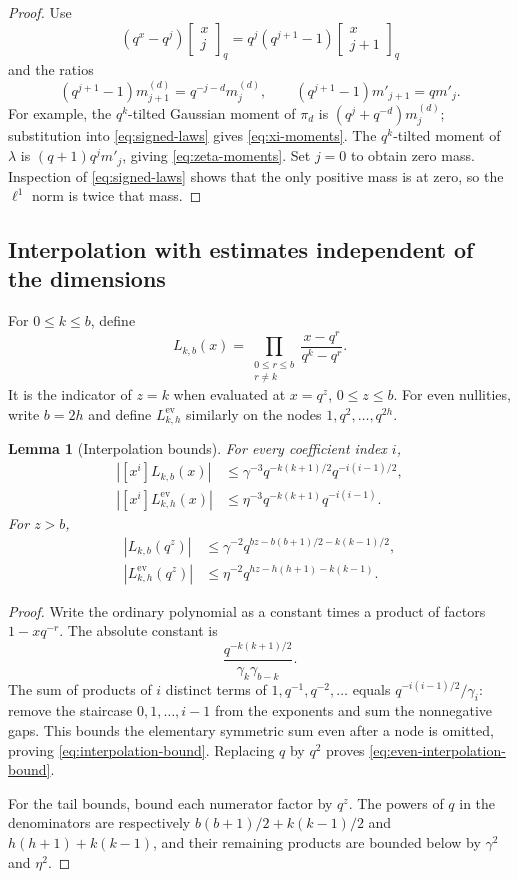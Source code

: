 \documentclass[11pt]{article}
\newtheorem{lemma}[theorem]{Lemma}
\theoremstyle{definition}
\theoremstyle{remark}
\newcommand{\gb}[2]{\begin{bmatrix}#1\\#2\end{bmatrix}_{q}}
\begin{document}
\begin{proof}
Use
\begin{equation}\label{eq:gaussian-shift}
 (q^x-q^j)\gb{x}{j}
 =q^j(q^{j+1}-1)\gb{x}{j+1}
\end{equation}
and the ratios
\[
 (q^{j+1}-1)m_{j+1}^{(d)}=q^{-j-d}m_j^{(d)},\qquad
 (q^{j+1}-1)m'_{j+1}=q m'_j.
\]
For example, the $q^k$-tilted Gaussian moment of $\pi_d$ is $(q^j+q^{-d})m_j^{(d)}$; substitution into \eqref{eq:signed-laws} gives \eqref{eq:xi-moments}. The $q^k$-tilted moment of $\lambda$ is $(q+1)q^jm'_j$, giving \eqref{eq:zeta-moments}. Set $j=0$ to obtain zero mass. Inspection of \eqref{eq:signed-laws} shows that the only positive mass is at zero, so the $\ell^1$ norm is twice that mass.
\end{proof}

\subsection{Interpolation with estimates independent of the dimensions}

For $0\le k\le b$, define
\[
 L_{k,b}(x)=\prod_{\substack{0\le r\le b\\r\ne k}}
 \frac{x-q^r}{q^k-q^r}.
\]
It is the indicator of $z=k$ when evaluated at $x=q^z$, $0\le z\le b$. For even nullities, write $b=2h$ and define $L^{\mathrm{ev}}_{k,h}$ similarly on the nodes $1,q^2,\ldots,q^{2h}$.

\begin{lemma}[Interpolation bounds]\label{lem:interpolation}
For every coefficient index $i$,
\begin{align}
 |[x^i]L_{k,b}(x)|
 &\le\gamma^{-3}q^{-k(k+1)/2}q^{-i(i-1)/2},\label{eq:interpolation-bound}\\
 |[x^i]L^{\mathrm{ev}}_{k,h}(x)|
 &\le\eta^{-3}q^{-k(k+1)}q^{-i(i-1)}.\label{eq:even-interpolation-bound}
\end{align}
For $z>b$,
\begin{align}
 |L_{k,b}(q^z)|
 &\le\gamma^{-2}q^{bz-b(b+1)/2-k(k-1)/2},\label{eq:ordinary-tail}\\
 |L^{\mathrm{ev}}_{k,h}(q^z)|
 &\le\eta^{-2}q^{hz-h(h+1)-k(k-1)}.
 \label{eq:even-tail}
\end{align}
\end{lemma}

\begin{proof}
Write the ordinary polynomial as a constant times a product of factors $1-xq^{-r}$. The absolute constant is
\[
 \frac{q^{-k(k+1)/2}}{\gamma_k\gamma_{b-k}}.
\]
The sum of products of $i$ distinct terms of $1,q^{-1},q^{-2},\ldots$ equals $q^{-i(i-1)/2}/\gamma_i$: remove the staircase $0,1,\ldots,i-1$ from the exponents and sum the nonnegative gaps. This bounds the elementary symmetric sum even after a node is omitted, proving \eqref{eq:interpolation-bound}. Replacing $q$ by $q^2$ proves \eqref{eq:even-interpolation-bound}.

For the tail bounds, bound each numerator factor by $q^z$. The powers of $q$ in the denominators are respectively $b(b+1)/2+k(k-1)/2$ and $h(h+1)+k(k-1)$, and their remaining products are bounded below by $\gamma^2$ and $\eta^2$.
\end{proof}
\end{document}
